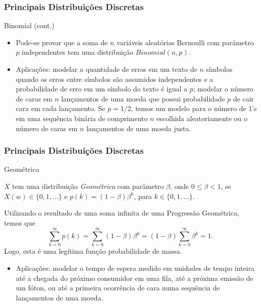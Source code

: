 \begin{frame}
\frametitle{\textbf{Principais Distribuições Discretas}}
\baselineskip=13pt
\begin{block}{Binomial (cont.)}

\begin{itemize}
\item Pode-se provar que a soma de $n$ variáveis aleatórias Bernoulli com parâmetro $p$ independentes tem uma distribuição $Binomial(n,p)$.

\item Aplicações: modelar a
quantidade de erros em um texto de $n$ símbolos quando os erros
entre símbolos são assumidos independentes e a probabilidade de erro
em um símbolo do texto é igual a $p$; modelar o número de caras em $n$ lançamentos de uma moeda que possui
probabilidade $p$ de cair cara em cada lançamento. Se $p=1/2$, temos
um modelo para o número de 1's em uma sequência binária de
comprimento $n$ escolhida aleatoriamente ou o número de caras em $n$
lançamentos de uma moeda justa.
\end{itemize}

\end{block}
\end{frame}
%
\begin{frame}
\frametitle{\textbf{Principais Distribuições Discretas}}
\baselineskip=13pt
\begin{block}{Geométrica}

$X$ tem uma distribuição {\em
Geométrica} com parâmetro $\beta$, onde $0\leq \beta <1$, se
$X(w)\in \{0,1,\ldots\}$ e $p(k)=(1-\beta)\beta^k$, para
$k\in\{0,1,\ldots\}$.

Utilizando o resultado de uma soma infinita de uma Progressão
Geométrica, temos que
$$\sum_{k=0}^{\infty}p(k)=\sum_{k=0}^{\infty}(1-\beta)\beta^k=(1-\beta)\sum_{k=0}^{\infty}\beta^k=1.$$
Logo, esta é uma legítima função probabilidade de massa.

\begin{itemize}
\item Aplicações: modelar
o tempo de espera medido em unidades de tempo inteira até a chegada
do próximo consumidor em uma fila, até a próxima emissão de um
fóton, ou até a primeira ocorrência de cara numa sequência de
lançamentos de uma moeda.
\end{itemize}

\end{block}
\end{frame}
%
